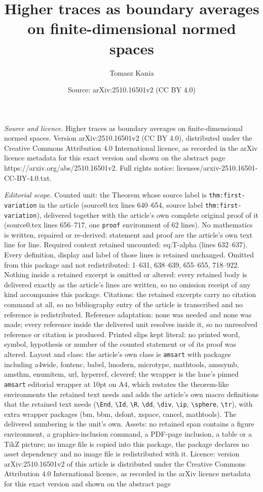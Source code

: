 \documentclass[10pt,a4paper]{amsart}
\title[Higher traces as boundary averages on finite-dimensional nor]{Higher traces as boundary averages on finite-dimensional normed spaces}
\author{Tomasz Kania}
\date{Source: arXiv:2510.16501v2 (CC BY 4.0)}
\begin{document}
\maketitle

\noindent\emph{Source and licence.} Higher traces as boundary averages on finite-dimensional normed spaces. Version arXiv:2510.16501v2 (CC BY 4.0), distributed under the Creative Commons Attribution 4.0 International licence, as recorded in the arXiv licence metadata for this exact version and shown on the abstract page https://arxiv.org/abs/2510.16501v2. Full rights notice: licenses/arxiv-2510.16501-CC-BY-4.0.txt.\par\smallskip

\noindent\textit{Editorial scope.} Counted unit: the Theorem whose source label is \texttt{thm:first-variation} in the article (source0.tex lines 640--654, source label \texttt{thm:first-variation}), delivered together with the article's own complete original proof of it (source0.tex lines 656--717, one \texttt{proof} environment of 62 lines). No mathematics is written, repaired or re-derived: statement and proof are the article's own text line for line. Required context retained uncounted: eq:T-alpha (lines 632--637). Every definition, display and label of those lines is retained unchanged. Omitted from this package and not redistributed: 1--631, 638--639, 655--655, 718--922. Nothing inside a retained excerpt is omitted or altered: every retained body is delivered exactly as the article's lines are written, so no omission receipt of any kind accompanies this package. Citations: the retained excerpts carry no citation command at all, so no bibliography entry of the article is transcribed and no reference is redistributed. Reference adaptation: none was needed and none was made; every reference inside the delivered unit resolves inside it, so no unresolved reference or citation is produced. Printed slips kept literal: no printed word, symbol, hypothesis or number of the counted statement or of its proof was altered. Layout and class: the article's own class is \texttt{amsart} with packages including a4wide, fontenc, babel, lmodern, microtype, mathtools, amssymb, amsthm, enumitem, url, hyperref, cleveref; the wrapper is the lane's pinned \texttt{amsart} editorial wrapper at 10pt on A4, which restates the theorem-like environments the retained text needs and adds the article's own macro definitions that the retained text needs (\texttt{\textbackslash End}, \texttt{\textbackslash Id}, \texttt{\textbackslash R}, \texttt{\textbackslash dd}, \texttt{\textbackslash div}, \texttt{\textbackslash ip}, \texttt{\textbackslash sphere}, \texttt{\textbackslash tr}), with extra wrapper packages (bm, bbm, dsfont, xspace, cancel, mathtools). The delivered numbering is the unit's own. Assets: no retained span contains a figure environment, a graphics-inclusion command, a PDF-page inclusion, a table or a TikZ picture; no image file is copied into this package, the package declares no asset dependency and no image file is redistributed with it. Licence: version arXiv:2510.16501v2 of this article is distributed under the Creative Commons Attribution 4.0 International licence, as recorded in the arXiv licence metadata for this exact version and shown on the abstract page 
\end{document}

